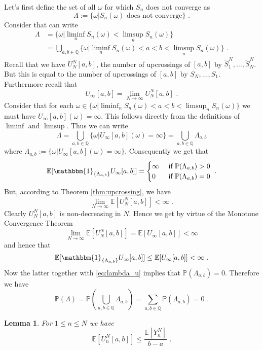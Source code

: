 \documentclass[phd]{UWMThesis}
\renewcommand{\P}{\mathbb{P}}
\newcommand{\E}{\mathbb{E}}
\newcommand{\StN}[1]{\tilde{S}_{#1}^N}
\newcommand{\YN}[1]{Y_{#1}^N}
\newcommand{\UNab}[1]{U_{#1}^N[a,b]}
\newcommand{\I}[1]{{\mathbbm{1}_{\{#1\}}}}
\newcommand{\mdot}{\textrm{ .}}
\renewcommand{\.}{\textrm{ .}}
\newtheorem{lemma}[thm]{Lemma}
\theoremstyle{definition}
\numberwithin{thm}{chapter}
\begin{document}
Let's first define the set of all $\omega$ for which $S_n$ does not converge as
$$\Lambda := \{\omega | S_n(\omega) \textrm{ does not converge}\}\mdot$$
%
Consider that can write
\begin{align*}
\Lambda &= \{\omega | \liminf_{n}S_n(\omega) < \limsup_{n} S_n(\omega)\}\\
&= \bigcup_{a,b\in\mathbb{Q}}\{\omega | \liminf_{n}S_n(\omega) < a < b < \limsup_{n} S_n(\omega)\}\mdot
\end{align*}
%  
Recall that we have $\UNab{N}$, the number of upcrossings of $[a,b]$ by $\StN{1}, \dots, \StN{N}$. But this is equal to the number of upcrossings of $[a,b]$ by $S_N, \dots, S_1$. Furthermore recall that 
$$U_\infty[a,b] = \lim\limits_{N\to\infty} \UNab{N}\mdot$$
%
Consider that for each $\omega \in \{\omega | \liminf_{n}S_n(\omega) < a < b < \limsup_{n} S_n(\omega)\}$ we must have $U_{\infty}[a,b](\omega) = \infty$. This follows directly from the definitions of $\liminf$ and $\limsup$. Thus we can write
\begin{equation*}
\Lambda = \bigcup_{a,b\in\mathbb{Q}}\{ \omega | U_\infty[a,b](\omega) = \infty\} = \bigcup_{a,b\in\mathbb{Q}} \Lambda_{a,b}
\end{equation*}
where $\Lambda_{a,b} := \{ \omega | U_\infty[a,b](\omega) = \infty\}$.
%
Consequently we get that
\begin{equation}
\E[\I{\Lambda_{a,b}} U_\infty[a,b]] = \begin{cases}
\infty &\textrm{ if } \P(\Lambda_{a,b})>0\\
0 &\textrm{ if } \P(\Lambda_{a,b})=0\\
\end{cases}\mdot
\label{eq:lambda_u}
\end{equation}
%
But, according to Theorem \ref{thm:upcrossing}, we have
$$\lim\limits_{N\to\infty}\E[\UNab{N}]<\infty\mdot$$
%
Clearly $\UNab{N}$ is non-decreasing in $N$. Hence we get by virtue of the Monotone Convergence Theorem 
$$\lim\limits_{N\to\infty}\E[\UNab{N}] = \E[U_\infty[a,b]] <\infty$$	
%	
and hence that
$$\E[\I{\Lambda_{a,b}} U_\infty[a,b]] \leq \E[U_\infty[a,b]] < \infty\mdot$$
%
Now the latter together with \eqref{eq:lambda_u} implies that $\P(\Lambda_{a,b}) = 0$. Therefore we have
\begin{equation*}
\P(\Lambda) = \P\left(\bigcup_{a,b\in\mathbb{Q}}\Lambda_{a,b}\right) = \sum_{a,b \in \mathbb{Q}} \P(\Lambda_{a,b}) = 0 \mdot
\end{equation*}
%
%
%
\begin{lemma}
	For $1\leq n\leq N$ we have
	$$\E[\UNab{n}]\leq \frac{\E[\YN{n}]}{b-a}\mdot$$
	\label{lem:upcrossings_yn}
\end{lemma}
\end{document}
